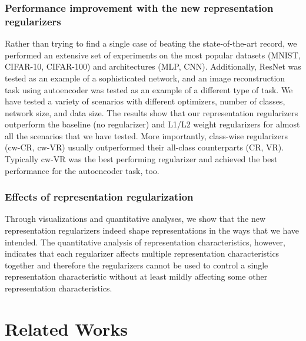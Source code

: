 \subsubsection{Performance improvement with the new representation regularizers}
Rather than trying to find a single case of beating the state-of-the-art record, we performed an extensive set of experiments on the most popular datasets (MNIST, CIFAR-10, CIFAR-100) and architectures (MLP, CNN). Additionally, ResNet \cite{he2016deep} was tested as an example of a sophisticated network, and an image reconstruction task using autoencoder was tested as an example of a different type of task. We have tested a variety of scenarios with different optimizers, number of classes, network size, and data size. The results show that our representation regularizers outperform the baseline (no regularizer) and L1/L2 weight regularizers for almost all the scenarios that we have tested. More importantly, class-wise regularizers (cw-CR, cw-VR) usually outperformed their all-class counterparts (CR, VR). Typically cw-VR was the best performing regularizer and achieved the best performance for the autoencoder task, too.

\subsubsection{Effects of representation regularization}
Through visualizations and quantitative analyses, we show that the new representation regularizers indeed shape representations in the ways that we have intended. The quantitative analysis of representation characteristics, however, indicates that each regularizer affects multiple representation characteristics together and therefore the regularizers cannot be used to control a single representation characteristic without at least mildly affecting some other representation characteristics. 



\section{Related Works}

